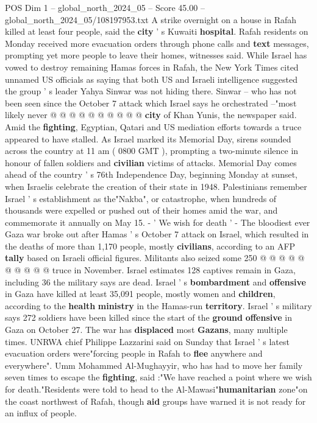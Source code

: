 \begin{textsample}{POS Dim 1 – global\_north\_2024\_05 – Score 45.00 – global\_north\_2024\_05/108197953.txt}
A strike overnight on a house in Rafah killed at least four people, said the \textbf{city} ' s Kuwaiti \textbf{hospital}.
Rafah residents on Monday received more evacuation orders through phone calls and \textbf{text} messages, prompting yet more people to leave their homes, witnesses said.
While Israel has vowed to destroy remaining Hamas forces in Rafah, the New York Times cited unnamed US officials as saying that both US and Israeli intelligence suggested the group ' s leader Yahya Sinwar was not hiding there.
Sinwar -- who has not been seen since the October 7 attack which Israel says he orchestrated --"most likely never @ @ @ @ @ @ @ @ @ @ \textbf{city} of Khan Yunis, the newspaper said.
Amid the \textbf{fighting}, Egyptian, Qatari and US mediation efforts towards a truce appeared to have stalled.
As Israel marked its Memorial Day, sirens sounded across the country at 11 am ( 0800 GMT ), prompting a two-minute silence in honour of fallen soldiers and \textbf{civilian} victims of attacks.
Memorial Day comes ahead of the country ' s 76th Independence Day, beginning Monday at sunset, when Israelis celebrate the creation of their state in 1948.
Palestinians remember Israel ' s establishment as the"Nakba", or catastrophe, when hundreds of thousands were expelled or pushed out of their homes amid the war, and commemorate it annually on May 15. - ' We wish for death ' - The bloodiest ever Gaza war broke out after Hamas ' s October 7 attack on Israel, which resulted in the deaths of more than 1,170 people, mostly \textbf{civilians}, according to an AFP \textbf{tally} based on Israeli official figures.
Militants also seized some 250 @ @ @ @ @ @ @ @ @ @ truce in November.
Israel estimates 128 captives remain in Gaza, including 36 the military says are dead.
Israel ' s \textbf{bombardment} and \textbf{offensive} in Gaza have killed at least 35,091 people, mostly women and \textbf{children}, according to the \textbf{health} \textbf{ministry} in the Hamas-run \textbf{territory}.
Israel ' s military says 272 soldiers have been killed since the start of the \textbf{ground} \textbf{offensive} in Gaza on October 27.
The war has \textbf{displaced} most \textbf{Gazans}, many multiple times.
UNRWA chief Philippe Lazzarini said on Sunday that Israel ' s latest evacuation orders were"forcing people in Rafah to \textbf{flee} anywhere and everywhere".
Umm Mohammed Al-Mughayyir, who has had to move her family seven times to escape the \textbf{fighting}, said :"We have reached a point where we wish for death."Residents were told to head to the Al-Mawasi"\textbf{humanitarian} zone"on the coast northwest of Rafah, though \textbf{aid} groups have warned it is not ready for an influx of people.

\end{textsample}
